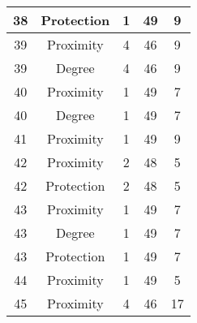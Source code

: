 \documentclass[results.tex]{subfiles}
\begin{document}
\begin{center}
\begin{tabular}{| c || c | c | c | c |}
            \hline
            38                      & Protection                   & 1                      & 49                      & 9                    \\
            \hline
            39                      & Proximity                    & 4                      & 46                      & 9                    \\
            \hline
            39                      & Degree                       & 4                      & 46                      & 9                    \\
            \hline
            40                      & Proximity                    & 1                      & 49                      & 7                    \\
            \hline
            40                      & Degree                       & 1                      & 49                      & 7                    \\
            \hline
            41                      & Proximity                    & 1                      & 49                      & 9                    \\
            \hline
            42                      & Proximity                    & 2                      & 48                      & 5                    \\
            \hline
            42                      & Protection                   & 2                      & 48                      & 5                    \\
            \hline
            43                      & Proximity                    & 1                      & 49                      & 7                    \\
            \hline
            43                      & Degree                       & 1                      & 49                      & 7                    \\
            \hline
            43                      & Protection                   & 1                      & 49                      & 7                    \\
            \hline
            44                      & Proximity                    & 1                      & 49                      & 5                    \\
            \hline
            45                      & Proximity                    & 4                      & 46                      & 17                   \\

\end{tabular}
\end{center}
\end{document}
